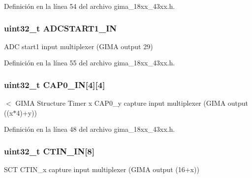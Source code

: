 Definición en la línea 54 del archivo gima\+\_\+18xx\+\_\+43xx.\+h.

\subsubsection[{\texorpdfstring{A\+D\+C\+S\+T\+A\+R\+T1\+\_\+\+IN}{ADCSTART1_IN}}]{ uint32\+\_\+t A\+D\+C\+S\+T\+A\+R\+T1\+\_\+\+IN}\hypertarget{struct_l_p_c___g_i_m_a___t_a3b18edfdc46f7cda6d9e2f258cb1ef39}{}\label{struct_l_p_c___g_i_m_a___t_a3b18edfdc46f7cda6d9e2f258cb1ef39}
A\+DC start1 input multiplexer (G\+I\+MA output 29) 

Definición en la línea 55 del archivo gima\+\_\+18xx\+\_\+43xx.\+h.

\subsubsection[{\texorpdfstring{C\+A\+P0\+\_\+\+IN}{CAP0_IN}}]{ uint32\+\_\+t C\+A\+P0\+\_\+\+IN\mbox{[}4\mbox{]}\mbox{[}4\mbox{]}}\hypertarget{struct_l_p_c___g_i_m_a___t_ac4bf5433d58f70d1e052a2280feb6b32}{}\label{struct_l_p_c___g_i_m_a___t_ac4bf5433d58f70d1e052a2280feb6b32}
$<$ G\+I\+MA Structure Timer x C\+A\+P0\+\_\+y capture input multiplexer (G\+I\+MA output ((x$\ast$4)+y)) 

Definición en la línea 48 del archivo gima\+\_\+18xx\+\_\+43xx.\+h.

\subsubsection[{\texorpdfstring{C\+T\+I\+N\+\_\+\+IN}{CTIN_IN}}]{ uint32\+\_\+t C\+T\+I\+N\+\_\+\+IN\mbox{[}8\mbox{]}}\hypertarget{struct_l_p_c___g_i_m_a___t_ae01400d9b9f4cd89700413fe60c7c1d0}{}\label{struct_l_p_c___g_i_m_a___t_ae01400d9b9f4cd89700413fe60c7c1d0}
S\+CT C\+T\+I\+N\+\_\+x capture input multiplexer (G\+I\+MA output (16+x)) 

